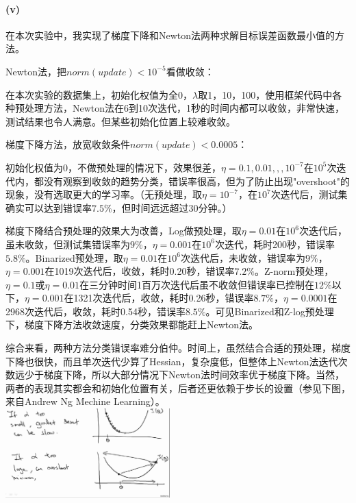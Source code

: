 \documentclass[hyperref,UTF8]{ctexart}
\begin{document}
\paragraph{(v)}在本次实验中，我实现了梯度下降和Newton法两种求解目标误差函数最小值的方法。
\par Newton法，把$norm(update) < 10^{-5}$看做收敛：
\par 在本次实验的数据集上，初始化权值为全0，$\lambda$取1，10，100，使用框架代码中各种预处理方法，Newton法在6到10次迭代，1秒的时间内都可以收敛，非常快速，测试结果也令人满意。但某些初始化位置上较难收敛。
\par 梯度下降方法，放宽收敛条件$norm(update) < 0.0005$：
\par 初始化权值为0，不做预处理的情况下，效果很差，$\eta = 0.1,0.01,,,10^{-7}$在$10^5$次迭代内，都没有观察到收敛的趋势分类，错误率很高，但为了防止出现"overshoot"的现象，没有选取更大的学习率。（无预处理，取$\eta=10^{-7}$，在$10^7$次迭代后，测试集确实可以达到错误率$7.5\%$，但时间远远超过30分钟。）
\par 梯度下降结合预处理的效果大为改善，Log做预处理，取$\eta=0.01$在$10^6$次迭代后，虽未收敛，但测试集错误率为$9\%$，$\eta=0.001$在$10^6$次迭代，耗时200秒，错误率$5.8\%$。Binarized预处理，取$\eta=0.01$在$10^6$次迭代后，未收敛，错误率为$9\%$，$\eta=0.001$在1019次迭代后，收敛，耗时0.20秒，错误率$7.2\%$。Z-norm预处理，$\eta=0.1$或$\eta=0.01$在三分钟时间1百万次迭代后虽不收敛但错误率已控制在$12\%$以下，$\eta=0.001$在1321次迭代后，收敛，耗时0.26秒，错误率$8.7\%$，$\eta=0.0001$在2968次迭代后，收敛，耗时0.54秒，错误率$8.5\%$。可见Binarized和Z-log预处理下，梯度下降方法收敛速度，分类效果都能赶上Newton法。
\par 综合来看，两种方法分类错误率难分伯仲。时间上，虽然结合合适的预处理，梯度下降也很快，而且单次迭代少算了Hessian，复杂度低，但整体上Newton法迭代次数远少于梯度下降，所以大部分情况下Newton法时间效率优于梯度下降。当然，两者的表现其实都会和初始化位置有关，后者还更依赖于步长的设置（参见下图，来自Andrew Ng Mechine Learning）。\\
\includegraphics[width=2.5in]{gdeta.png}
\end{document}
